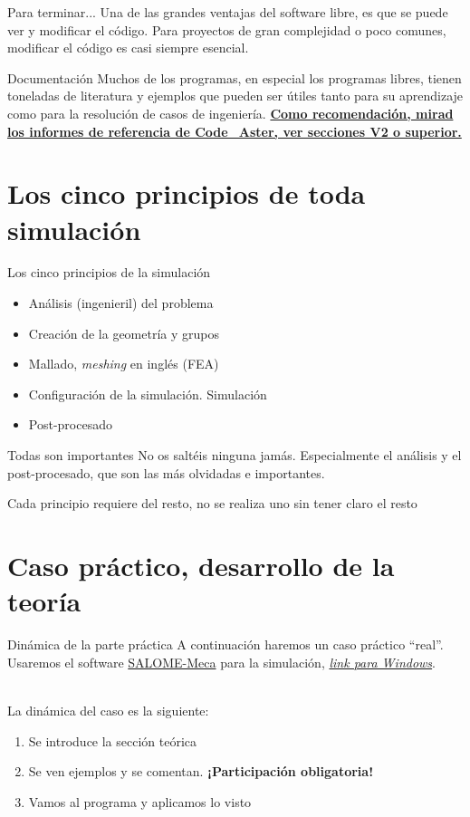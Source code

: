 \documentclass[12pt]{beamer}
\begin{document}
\begin{frame}{Para terminar...}
	Una de las grandes ventajas del software libre, es que se puede ver y modificar el código. Para proyectos de gran complejidad o poco comunes, modificar el código es casi siempre esencial.
	
	\begin{block}{Documentación}
		Muchos de los programas, en especial los programas libres, tienen toneladas de literatura y ejemplos que pueden ser útiles tanto para su aprendizaje como para la resolución de casos de ingeniería. \href{https://www.code-aster.org/V2/doc/v13/en/index.php?man=R0}{\textbf{Como recomendación, mirad los informes de referencia de Code\_Aster, ver secciones V2 o superior.}}
	\end{block}
\end{frame}

\section{Los cinco principios de toda simulación}

\begin{frame}{Los cinco principios de la simulación}
	\begin{itemize}
		\item Análisis (ingenieril) del problema
		\item Creación de la geometría y grupos
		\item Mallado, \textit{meshing} en inglés (FEA)
		\item Configuración de la simulación. Simulación
		\item Post-procesado
	\end{itemize} \pause
	\begin{block}{Todas son importantes}
		No os saltéis ninguna jamás. Especialmente el análisis y el post-procesado, que son las más olvidadas e importantes.
	\end{block}
	Cada principio requiere del resto, no se realiza uno sin tener claro el resto
\end{frame}

\section{Caso práctico, desarrollo de la teoría}

\begin{frame}{Dinámica de la parte práctica}
	A continuación haremos un caso práctico ``real''. Usaremos el software \href{https://code-aster.org/spip.php?article303}{SALOME-Meca} para la simulación, \href{https://code-aster-windows.com/download/}{\textit{link para Windows}}. \\~
	
	La dinámica del caso es la siguiente:
	\begin{enumerate}
		\item Se introduce la sección teórica
		\item Se ven ejemplos y se comentan. \textbf{¡Participación obligatoria!}
		\item Vamos al programa y aplicamos lo visto
	\end{enumerate}
\end{frame}
\end{document}
